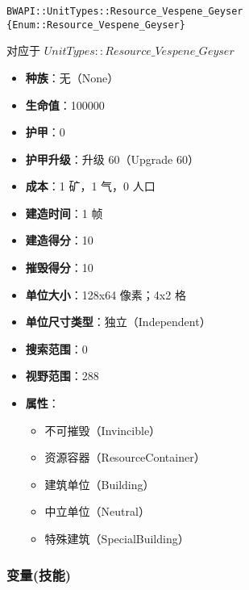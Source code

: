 \begin{tcolorbox}[colback=white, colframe=black!60!white, title=Resource\_Vespene\_Geyser(), arc=0mm]
    \begin{verbatim}
BWAPI::UnitTypes::Resource_Vespene_Geyser {Enum::Resource_Vespene_Geyser}
    \end{verbatim}
    对应于  $UnitTypes::Resource\_Vespene\_Geyser$ 
    \begin{itemize}
        \item \textbf{种族}：无（None）
        \item \textbf{生命值}：100000
        \item \textbf{护甲}：0
        \item \textbf{护甲升级}：升级 60（Upgrade 60）
        \item \textbf{成本}：1 矿，1 气，0 人口
        \item \textbf{建造时间}：1 帧
        \item \textbf{建造得分}：10
        \item \textbf{摧毁得分}：10
        \item \textbf{单位大小}：128x64 像素；4x2 格
        \item \textbf{单位尺寸类型}：独立（Independent）
        \item \textbf{搜索范围}：0
        \item \textbf{视野范围}：288
        \item \textbf{属性}：
            \begin{itemize}
                \item 不可摧毁（Invincible）
                \item 资源容器（ResourceContainer）
                \item 建筑单位（Building）
                \item 中立单位（Neutral）
                \item 特殊建筑（SpecialBuilding）
            \end{itemize}
    \end{itemize}
\end{tcolorbox}

\subsubsection{变量(技能)}

